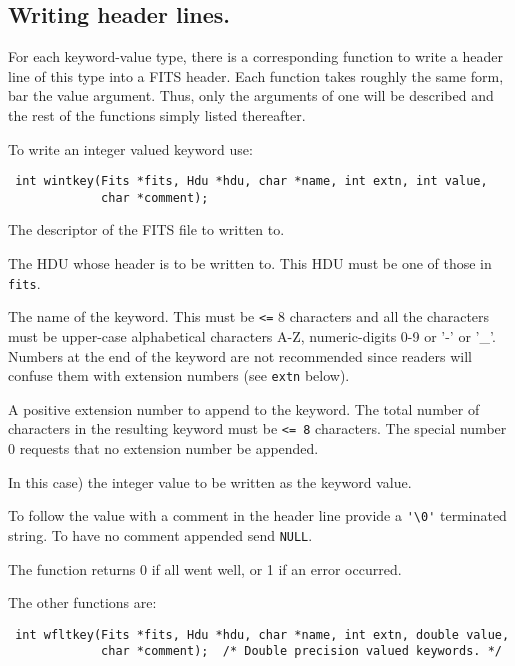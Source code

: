 \subsection{Writing header lines.}
For each keyword-value type, there is a corresponding function to
write a header line of this type into a FITS header. Each function
takes roughly the same form, bar the value argument. Thus, only the
arguments of one will be described and the rest of the functions
simply listed thereafter.

To write an integer valued keyword use:
\label{wintkey}\begin{verbatim}
 int wintkey(Fits *fits, Hdu *hdu, char *name, int extn, int value,
             char *comment);
\end{verbatim}
\begin{arglist}

 The descriptor of the FITS file to written to.

 The HDU whose header is to be written to. This HDU must be
            one of those in \verb`fits`.

 The name of the keyword. This must be \verb`<=` 8
            characters and all the characters must be upper-case alphabetical
            characters A-Z, numeric-digits 0-9 or '-' or '\_'. Numbers
            at the end of the keyword are not recommended since readers
            will confuse them with extension numbers (see \verb`extn` below).

 A positive extension number to append to the keyword. The
            total number of characters in the resulting keyword must be
            \verb`<= 8` characters. The special number 0 requests that no
            extension number be appended.

 In this case) the integer value to be written as the
            keyword value.

 To follow the value with a comment in the header line
            provide a \verb`'\0'` terminated string. To have no comment
            appended send \verb`NULL`.
\end{arglist}

The function returns 0 if all went well, or 1 if an error occurred.

The other functions are:
\label{wfltkey}\begin{verbatim}
 int wfltkey(Fits *fits, Hdu *hdu, char *name, int extn, double value,
             char *comment);  /* Double precision valued keywords. */
\end{verbatim}

